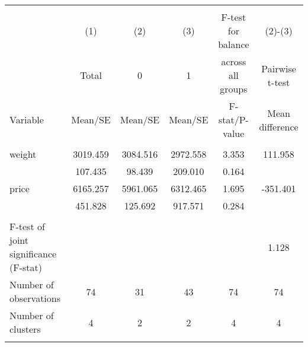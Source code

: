 
\begin{tabular}{@{\extracolsep{5pt}}lccccc}
\\[-1.8ex]\hline \hline \\[-1.8ex]
 & \multicolumn{1}{c}{(1)}  & \multicolumn{1}{c}{(2)}  & \multicolumn{1}{c}{(3)}  & \multicolumn{1}{c}{F-test for balance} & \multicolumn{1}{c}{(2)-(3)} \\
 & \multicolumn{1}{c}{Total}  & \multicolumn{1}{c}{0}  & \multicolumn{1}{c}{1}  & \multicolumn{1}{c}{across all groups} & \multicolumn{1}{c}{Pairwise t-test}  \\
Variable & Mean/SE & Mean/SE & Mean/SE & F-stat/P-value & Mean difference \\ \hline \\[-1.8ex] 
weight   &  3019.459    &  3084.516    &  2972.558    &     3.353    &   111.958   \\
 &   107.435  &    98.439  &   209.010  &     0.164  &   \\
price   &  6165.257    &  5961.065    &  6312.465    &     1.695    &  -351.401   \\
 &   451.828  &   125.692  &   917.571  &     0.284  &   \\
\hline \\[-1.8ex]
F-test of joint significance (F-stat) &   &   &   &     &      1.128   \\
Number of observations  & 74   & 31   & 43  & 74 & 74   \\
Number of clusters & 4  & 2  & 2  & 4 & 4   \\
\hline \\[-1.8ex]

\end{tabular}
